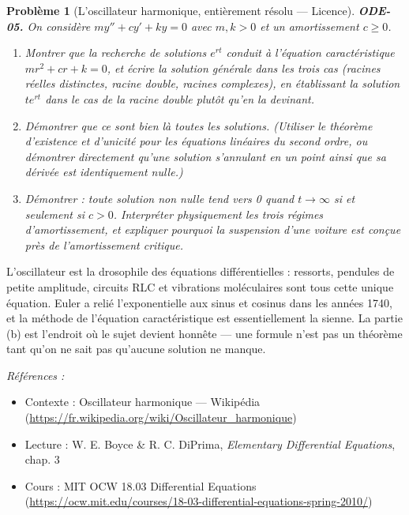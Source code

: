 \documentclass[11pt]{article}
\newtheorem{problem}{Problème}
\newenvironment{refs}{\par\small\noindent\emph{Références :}\begin{itemize}\setlength\itemsep{0pt}}{\end{itemize}\normalsize}
\begin{document}
\bigskip

\begin{problem}[{L'oscillateur harmonique, entièrement résolu --- Licence}]
\textbf{ODE-05.} On considère $ m y'' + c y' + k y = 0 $ avec
$ m, k >0 $ et un amortissement $ c \ge 0 $.
\begin{enumerate}
\item[(a)] Montrer que la recherche de solutions $ e^{rt} $ conduit à l'équation caractéristique
$ m r^2 + c r + k = 0 $, et écrire la solution générale dans les trois cas (racines réelles
distinctes, racine double, racines complexes), en \textit{établissant} la solution $ t e^{rt} $
dans le cas de la racine double plutôt qu'en la devinant.
\item[(b)] Démontrer que ce sont bien là \textit{toutes} les solutions. (Utiliser le théorème d'existence
et d'unicité pour les équations linéaires du second ordre, ou démontrer directement qu'une
solution s'annulant en un point ainsi que sa dérivée est identiquement nulle.)
\item[(c)] Démontrer : toute solution non nulle tend vers 0 quand $ t \to \infty $ si et seulement si
$ c >0 $. Interpréter physiquement les trois régimes d'amortissement, et expliquer pourquoi
la suspension d'une voiture est conçue près de l'amortissement critique.
\end{enumerate}

\end{problem}

\noindent L'oscillateur est la drosophile des équations différentielles : ressorts,
pendules de petite amplitude, circuits RLC et vibrations moléculaires sont tous cette unique
équation. Euler a relié l'exponentielle aux sinus et cosinus dans les années 1740, et la méthode
de l'équation caractéristique est essentiellement la sienne. La partie (b) est l'endroit où le
sujet devient honnête --- une formule n'est pas un théorème tant qu'on ne sait pas qu'aucune
solution ne manque.

\begin{refs}
\item Contexte : Oscillateur harmonique --- Wikipédia (\url{https://fr.wikipedia.org/wiki/Oscillateur_harmonique})
\item Lecture : W. E. Boyce \& R. C. DiPrima, \textit{Elementary Differential Equations}, chap. 3
\item Cours : MIT OCW 18.03 Differential Equations (\url{https://ocw.mit.edu/courses/18-03-differential-equations-spring-2010/})
\end{refs}
\end{document}
